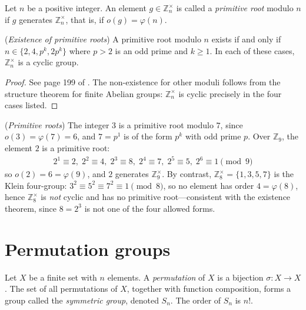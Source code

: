 \documentclass[a4paper, 12pt]{book} %
\begin{document}
\begin{definition}
    Let $n$ be a positive integer. An element $g \in \mathbb{Z}_n^\times$ is called a \emph{primitive root} modulo $n$ if $g$ generates $\mathbb{Z}_n^\times$, that is, if $o(g) = \varphi(n)$.
\end{definition}

\begin{theorem}
    (\emph{Existence of primitive roots}) A primitive root modulo $n$ exists if and only if $n \in \{2, 4, p^k, 2p^k\}$ where $p > 2$ is an odd prime and $k \geq 1$. In each of these cases, $\mathbb{Z}_n^\times$ is a cyclic group.
\end{theorem}
\begin{proof}
    See page 199 of \cite{zheng2022modern}. The non-existence for other moduli follows from the structure theorem for finite Abelian groups: $\mathbb{Z}_n^\times$ is cyclic precisely in the four cases listed.
\end{proof}

\begin{example}
    (\emph{Primitive roots}) The integer $3$ is a primitive root modulo $7$, since $o(3) = \varphi(7) = 6$, and $7 = p^1$ is of the form $p^k$ with odd prime $p$. Over $\mathbb{Z}_9$, the element $2$ is a primitive root:
    \begin{align}
        2^1 \equiv 2,\; 2^2 \equiv 4,\; 2^3 \equiv 8,\; 2^4 \equiv 7,\; 2^5 \equiv 5,\; 2^6 \equiv 1 \pmod 9
    \end{align}
    so $o(2) = 6 = \varphi(9)$, and $2$ generates $\mathbb{Z}_9^\times$. By contrast, $\mathbb{Z}_8^\times = \{1,3,5,7\}$ is the Klein four-group: $3^2 \equiv 5^2 \equiv 7^2 \equiv 1 \pmod 8$, so no element has order $4 = \varphi(8)$, hence $\mathbb{Z}_8^\times$ is \emph{not} cyclic and has no primitive root---consistent with the existence theorem, since $8 = 2^3$ is not one of the four allowed forms.
\end{example}

\section{Permutation groups}

\begin{definition}
    Let $X$ be a finite set with $n$ elements. A \emph{permutation} of $X$ is a bijection $\sigma: X \longrightarrow X$. The set of all permutations of $X$, together with function composition, forms a group called the \emph{symmetric group}, denoted $S_n$. The order of $S_n$ is $n!$.
\end{definition}
\end{document}
